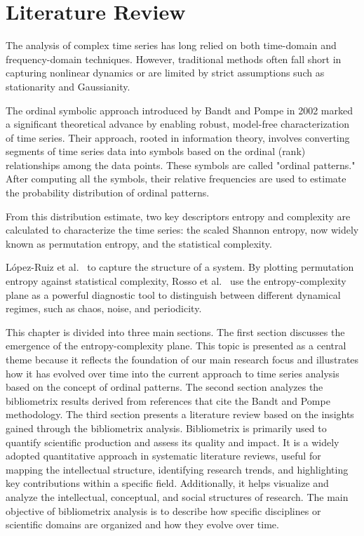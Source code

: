 \chapter{Literature Review}\label{C:lit}

The analysis of complex time series has long relied on both time-domain and frequency-domain techniques. 
However, traditional methods often fall short in capturing nonlinear dynamics or are limited by strict assumptions such as stationarity and Gaussianity. 

The ordinal symbolic approach introduced by Bandt and Pompe in 2002 marked a significant theoretical advance by enabling robust, model-free characterization of time series. 
Their approach, rooted in information theory, involves converting segments of time series data into symbols based on the ordinal (rank) relationships among the data points.
These symbols are called "ordinal patterns." After computing all the symbols, their relative frequencies are used to estimate the probability distribution of ordinal patterns.

From this distribution estimate, two key descriptors entropy and complexity are calculated to characterize the time series: the scaled Shannon entropy, now widely known as permutation entropy, and the statistical complexity.

López-Ruiz et al.~\cite{lopez1995statistical} to capture the structure of a system. By plotting permutation entropy against statistical complexity, Rosso et al.~\cite{Rosso2007} use the entropy-complexity plane as a powerful diagnostic tool to distinguish between different dynamical regimes, such as chaos, noise, and periodicity.

This chapter is divided into three main sections. The first section discusses the emergence of the entropy-complexity plane. This topic is presented as a central theme because it reflects the foundation of our main research focus and illustrates how it has evolved over time into the current approach to time series analysis based on the concept of ordinal patterns.
The second section analyzes the bibliometrix results derived from references that cite the Bandt and Pompe methodology. The third section presents a literature review based on the insights gained through the bibliometrix analysis. Bibliometrix is primarily used to quantify scientific production and assess its quality and impact. It is a widely adopted quantitative approach in systematic literature reviews, useful for mapping the intellectual structure, identifying research trends, and highlighting key contributions within a specific field. Additionally, it helps visualize and analyze the intellectual, conceptual, and social structures of research. The main objective of bibliometrix analysis is to describe how specific disciplines or scientific domains are organized and how they evolve over time.

